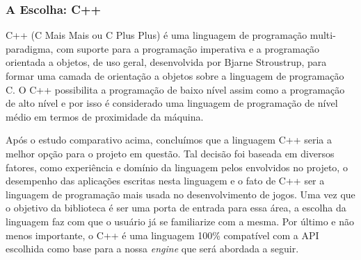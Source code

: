 \subsubsection{A Escolha: C++}
%
C++ (C Mais Mais ou C Plus Plus) \cite{Mizrahi} é uma linguagem de programação multi-paradigma, com suporte para a programação imperativa e a programação orientada a objetos, de uso geral, desenvolvida por Bjarne Stroustrup, para formar uma camada de orientação a objetos sobre a linguagem de programação C. O C++ possibilita a programação de baixo nível assim como a programação de alto nível e por isso é considerado uma linguagem de programação de nível médio em termos de proximidade da máquina.
\par
Após o estudo comparativo acima, concluímos que a linguagem C++ seria a melhor opção para o projeto em questão. Tal decisão foi baseada em diversos fatores, como experiência e domínio da linguagem pelos envolvidos no projeto, o desempenho das aplicações escritas nesta linguagem e o fato de C++ ser a linguagem de programação mais usada no desenvolvimento de jogos. Uma vez que o objetivo da biblioteca é ser uma porta de entrada para essa área, a escolha da linguagem faz com que o usuário já se familiarize com a mesma. Por último e não menos importante, o C++ é uma linguagem 100\% compatível com a API escolhida como base para a nossa \textit{engine} que será abordada a seguir.
%
%
